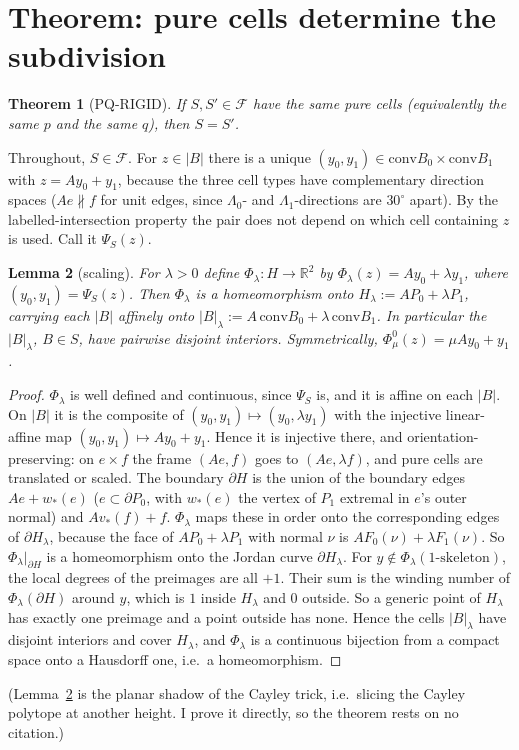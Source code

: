 \documentclass[11pt]{article}
\newtheorem{theorem}{Theorem}
\newtheorem{lemma}[theorem]{Lemma}
\theoremstyle{definition}
\begin{document}
\section{Theorem: pure cells determine the subdivision}
\begin{theorem}[PQ-RIGID]\label{thm:pq}
If $S,S'\in\mathcal F$ have the same pure cells (equivalently the same $p$ and the same $q$), then $S=S'$.
\end{theorem}

Throughout, $S\in\mathcal F$. For $z\in|B|$ there is a unique $(y_0,y_1)\in\mathrm{conv}B_0\times\mathrm{conv}B_1$ with $z=Ay_0+y_1$, because the
three cell types have complementary direction spaces ($A e\nparallel f$ for unit edges, since $\Lambda_0$- and $\Lambda_1$-directions are $30^\circ$ apart).
By the labelled-intersection property the pair does not depend on which cell containing $z$ is used. Call it $\Psi_S(z)$.

\begin{lemma}[scaling]\label{lem:scale}
For $\lambda>0$ define $\Phi_\lambda:H\to\mathbb R^2$ by $\Phi_\lambda(z)=Ay_0+\lambda y_1$, where $(y_0,y_1)=\Psi_S(z)$. Then $\Phi_\lambda$ is a
homeomorphism onto $H_\lambda:=AP_0+\lambda P_1$, carrying each $|B|$ affinely onto $|B|_\lambda:=A\,\mathrm{conv}B_0+\lambda\,\mathrm{conv}B_1$.
In particular the $|B|_\lambda$, $B\in S$, have pairwise disjoint interiors. Symmetrically, $\Phi^0_\mu(z)=\mu Ay_0+y_1$.
\end{lemma}
\begin{proof}
$\Phi_\lambda$ is well defined and continuous, since $\Psi_S$ is, and it is affine on each $|B|$. On $|B|$ it is the composite of
$(y_0,y_1)\mapsto(y_0,\lambda y_1)$ with the injective linear-affine map $(y_0,y_1)\mapsto Ay_0+y_1$. Hence it is injective there, and
orientation-preserving: on $e\times f$ the frame $(Ae,f)$ goes to $(Ae,\lambda f)$, and pure cells are translated or scaled.
The boundary $\partial H$ is the union of the boundary edges $Ae+w_*(e)$ ($e\subset\partial P_0$, with $w_*(e)$ the vertex of $P_1$ extremal in $e$'s outer normal) and
$Av_*(f)+f$. $\Phi_\lambda$ maps these in order onto the corresponding edges of $\partial H_\lambda$, because the face of $AP_0+\lambda P_1$ with normal $\nu$ is
$AF_0(\nu)+\lambda F_1(\nu)$. So $\Phi_\lambda|_{\partial H}$ is a homeomorphism onto the Jordan curve $\partial H_\lambda$.
For $y\notin\Phi_\lambda(\text{1-skeleton})$, the local degrees of the preimages are all $+1$. Their sum is the winding number of $\Phi_\lambda(\partial H)$ around $y$,
which is $1$ inside $H_\lambda$ and $0$ outside. So a generic point of $H_\lambda$ has exactly one preimage and a point outside has none. Hence the cells $|B|_\lambda$ have disjoint interiors and cover
$H_\lambda$, and $\Phi_\lambda$ is a continuous bijection from a compact space onto a Hausdorff one, i.e.\ a homeomorphism.
\end{proof}
(Lemma~\ref{lem:scale} is the planar shadow of the Cayley trick, i.e.\ slicing the Cayley polytope at another height. I prove it directly, so the
theorem rests on no citation.)
\end{document}
